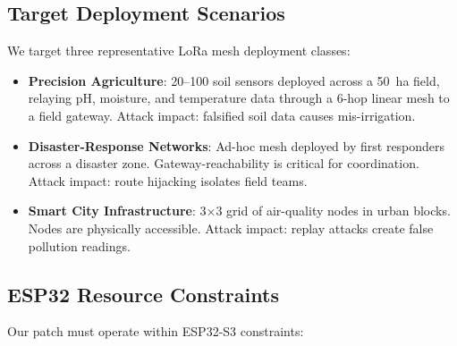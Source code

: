 \documentclass[preprint,12pt]{elsarticle}
\begin{document}
\subsection{Target Deployment Scenarios}

We target three representative LoRa mesh deployment classes:

\begin{itemize}
  \item \textbf{Precision Agriculture}: 20–100 soil sensors deployed
    across a 50~ha field, relaying pH, moisture, and temperature
    data through a 6-hop linear mesh to a field gateway.
    Attack impact: falsified soil data causes mis-irrigation.

  \item \textbf{Disaster-Response Networks}: Ad-hoc mesh deployed
    by first responders across a disaster zone. Gateway-reachability
    is critical for coordination. Attack impact: route hijacking
    isolates field teams.

  \item \textbf{Smart City Infrastructure}: 3×3 grid of air-quality
    nodes in urban blocks. Nodes are physically accessible.
    Attack impact: replay attacks create false pollution readings.
\end{itemize}

\subsection{ESP32 Resource Constraints}

Our patch must operate within ESP32-S3 constraints:

\begin{table}[t]
  \centering
  \caption{ESP32-S3 Resource Budget for LoRaMesher Security Patch}
  \label{tab:esp32}
\end{table}
\end{document}
